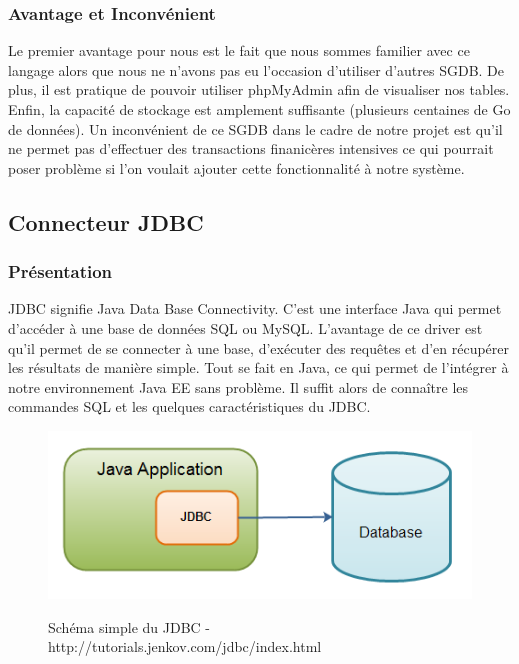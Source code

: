 \subsubsection{Avantage et Inconvénient}
Le premier avantage pour nous est le fait que nous sommes familier avec ce langage alors que nous ne n'avons pas eu l'occasion d'utiliser d'autres SGDB.
De plus, il est pratique de pouvoir utiliser phpMyAdmin afin de visualiser nos tables. Enfin, la capacité de stockage est amplement suffisante (plusieurs centaines de Go de données).
Un inconvénient de ce SGDB dans le cadre de notre projet est qu'il ne permet pas d'effectuer des transactions finanicères intensives ce qui pourrait poser problème si l'on voulait ajouter cette fonctionnalité à notre système.

\subsection{Connecteur JDBC}

\subsubsection{Présentation}
JDBC signifie Java Data Base Connectivity. C'est une interface Java qui permet d'accéder à une base de données SQL ou MySQL. L'avantage de ce driver est qu'il permet de se connecter à une base, d'exécuter des requêtes et d'en récupérer les résultats de manière simple. Tout se fait en Java, ce qui permet de l'intégrer à notre environnement Java EE sans problème. Il suffit alors de connaître les commandes SQL et les quelques caractéristiques du JDBC.\\

\begin{figure}[!h]
  \center
  \includegraphics[scale=0.7]{../graph/jdbc.png} \\
  \caption{Schéma simple du JDBC - http://tutorials.jenkov.com/jdbc/index.html}
\end{figure}

